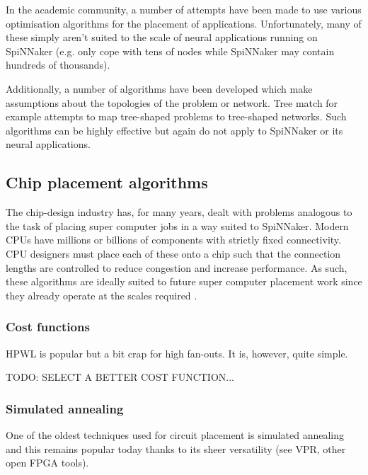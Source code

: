 				
				In the academic community, a number of attempts have been made to use
				various optimisation algorithms for the placement of applications.
				Unfortunately, many of these simply aren't suited to the scale of
				neural applications running on SpiNNaker (e.g. only cope with tens of
				nodes while SpiNNaker may contain hundreds of thousands).
				
				Additionally, a number of algorithms have been developed which make
				assumptions about the topologies of the problem or network. Tree match
				for example attempts to map tree-shaped problems to tree-shaped
				networks. Such algorithms can be highly effective but again do not
				apply to SpiNNaker or its neural applications.
		
		\subsection{Chip placement algorithms}
			
			The chip-design industry has, for many years, dealt with problems
			analogous to the task of placing super computer jobs in a way suited to
			SpiNNaker. Modern CPUs have millions or billions of components with
			strictly fixed connectivity. CPU designers must place each of these onto
			a chip such that the connection lengths are controlled to reduce
			congestion and increase performance. As such, these algorithms are
			ideally suited to future super computer placement work since they already
			operate at the scales required \cite{nam07}.
			
			\subsubsection{Cost functions}
				
				HPWL is popular but a bit crap for high fan-outs. It is, however, quite
				simple.
				
				TODO: SELECT A BETTER COST FUNCTION...
			
			\subsubsection{Simulated annealing}
				
				One of the oldest techniques used for circuit placement is simulated
				annealing and this remains popular today thanks to its sheer
				versatility (see VPR, other open FPGA tools).
				
